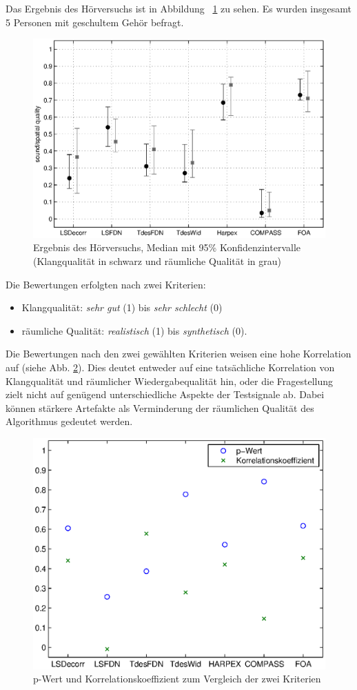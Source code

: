 Das Ergebnis des Hörversuchs ist in Abbildung ~\ref{fig:versuch} zu sehen. Es wurden insgesamt 5 Personen mit geschultem Gehör befragt.

\begin{figure}[!ht]
  \centering
  \includegraphics[width=1\textwidth]{ergebnis/plots/result.eps}
  \caption{Ergebnis des Hörversuchs, Median mit 95\% Konfidenzintervalle (Klangqualität in schwarz und räumliche Qualität in grau)}
  \label{fig:versuch}
\end{figure}

Die Bewertungen erfolgten nach zwei Kriterien:

\begin{itemize}
  \item Klangqualität: \textit{sehr gut} (1) bis \textit{sehr schlecht} (0)
  \item räumliche Qualität: \textit{realistisch} (1) bis \textit{synthetisch} (0).
\end{itemize}

Die Bewertungen nach den zwei gewählten Kriterien weisen eine hohe Korrelation auf (siehe Abb. \ref{fig:p-value}). Dies deutet entweder auf eine tatsächliche Korrelation von Klangqualität und räumlicher Wiedergabequalität hin, oder die Fragestellung zielt nicht auf genügend unterschiedliche Aspekte der Testsignale ab. Dabei können stärkere Artefakte als Verminderung der räumlichen Qualität des Algorithmus gedeutet werden.

\begin{figure}[!ht]
  \centering
  \includegraphics[width=1\textwidth]{ergebnis/plots/Raum_und_Klang_Zusammenhang_for_t-test.eps}
  \caption{p-Wert und Korrelationskoeffizient zum Vergleich der zwei Kriterien}
  \label{fig:p-value}
\end{figure}
